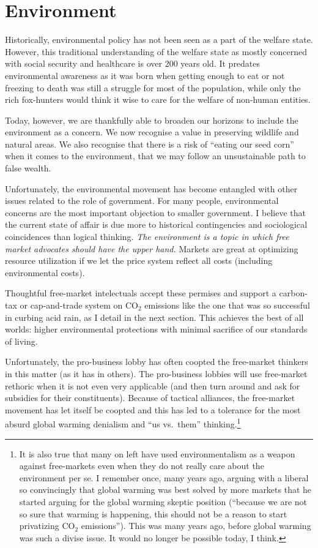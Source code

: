 \chapter{Environment}
\label{chpt:environment}

Historically, environmental policy has not been seen as a part of the welfare
state.  However, this traditional understanding of the welfare state as mostly
concerned with social security and healthcare is over 200 years old. It
predates environmental awareness as it was born when getting enough to eat or
not freezing to death was still a struggle for most of the population, while
only the rich fox-hunters would think it wise to care for the welfare of
non-human entities.

Today, however, we are thankfully able to broaden our horizons to include the
environment as a concern. We now recognise a value in preserving wildlife and
natural areas. We also recognise that there is a risk of ``eating our seed
corn'' when it comes to the environment, that we may follow an unsustainable
path to false wealth.

Unfortunately, the environmental movement has become entangled with other
issues related to the role of government. For many people, environmental
concerns are the most important objection to smaller government. I believe
that the current state of affair is due more to historical contingencies and
sociological coincidences than logical thinking. \emph{The environment is a
topic in which free market advocates should have the upper hand.} Markets are
great at optimizing resource utilization if we let the price system reflect all
costs (including environmental costs).

Thoughtful free-market intelectuals accept these permises and support a
carbon-tax or cap-and-trade system on CO$_2$ emissions like the one that was so
successful in curbing acid rain, as I detail in the next section. This achieves
the best of all worlds: higher environmental protections with minimal sacrifice
of our standards of living.

Unfortunately, the pro-business lobby has often coopted the free-market
thinkers in this matter (as it has in others). The pro-business lobbies will
use free-market rethoric when it is not even very applicable (and then turn
around and ask for subsidies for their constituents). Because of tactical
alliances, the free-market movement has let itself be coopted and this has led
to a tolerance for the most absurd global warming denialism and ``us vs.\
them'' thinking.\footnote{It is also true that many on left have used
environmentalism as a weapon against free-markets even when they do not really
care about the environment per se. I remember once, many years ago, arguing
with a liberal so convincingly that global warming was best solved by more
markets that he started arguing for the global warming skeptic position
(``because we are not so sure that warming is happening, this should not be a
reason to start privatizing CO${}_2$ emissions''). This was many years ago,
before global warming was such a divise issue. It would no longer be possible
today, I think.}

